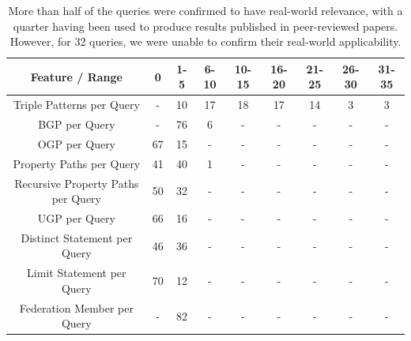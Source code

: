 \begin{table}
    \begin{center}
        \begin{tabular}{|*{9}{c|}}
        \hline
        Feature / Range & 0 & 1-5 & 6-10 & 10-15 & 16-20 & 21-25 & 26-30 & 31-35 \\ 
        \hline \hline
        Triple Patterns per Query & - & 10 & 17 & 18 & 17 & 14 & 3 & 3 \\ 
        \hline
        BGP per Query & - & 76 & 6 & - & - & - & - & - \\ 
        \hline
        OGP per Query & 67 & 15 & - & - & - & - & - & - \\ 
        \hline
        Property Paths per Query & 41 & 40 & 1 & - & - & - & - & - \\ 
        \hline
        Recursive Property Paths per Query & 50 & 32 & - & - & - & - & - & - \\ 
        \hline
        UGP per Query & 66 & 16 & - & - & - & - & - & - \\ 
        \hline
        Distinct Statement per Query & 46 & 36 & - & - & - & - & - & - \\ 
        \hline
        Limit Statement per Query & 70 & 12 & - & - & - & - & - & - \\  
        \hline
        Federation Member per Query & - & 82 & - & - & - & - & - & - \\  
        \hline
        \end{tabular}
    \end{center}
    \caption{
        More than half of the queries were confirmed to have real-world relevance, with a quarter having been used to produce results published in peer-reviewed papers.
        However, for 32 queries, we were unable to confirm their real-world applicability.
    }
    \label{tab:binQueryStat}
\end{table}